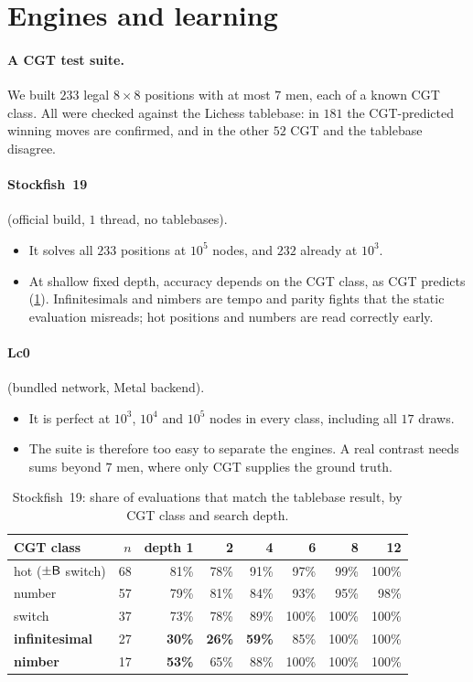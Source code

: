 \section{Engines and learning}\label{sec:engines}

\paragraph{A CGT test suite.} We built $233$ legal $8\times8$ positions with at most $7$ men, each of a known
CGT class. All were checked against the Lichess tablebase: in $181$ the CGT-predicted winning moves are
confirmed, and in the other $52$ CGT and the tablebase disagree.

\paragraph{Stockfish~19} (official build, $1$ thread, no tablebases).
\begin{itemize}
\item It solves all $233$ positions at $10^5$ nodes, and $232$ already at $10^3$.
\item At shallow fixed depth, accuracy depends on the CGT class, as CGT predicts (\cref{tab:sf}). Infinitesimals
  and nimbers are tempo and parity fights that the static evaluation misreads; hot positions and numbers are
  read correctly early.
\end{itemize}

\paragraph{Lc0} (bundled network, Metal backend).
\begin{itemize}
\item It is perfect at $10^3$, $10^4$ and $10^5$ nodes in every class, including all $17$ draws.
\item The suite is therefore too easy to separate the engines. A real contrast needs sums beyond $7$ men, where
  only CGT supplies the ground truth.
\end{itemize}

\begin{table}[ht]
\centering\small
\begin{tabular}{@{}lrrrrrrr@{}}
\toprule
CGT class & $n$ & depth 1 & 2 & 4 & 6 & 8 & 12 \\
\midrule
hot ($\pm\mathsf{B}$ switch) & 68 & 81\% & 78\% & 91\% & 97\% & 99\% & 100\% \\
number & 57 & 79\% & 81\% & 84\% & 93\% & 95\% & 98\% \\
switch & 37 & 73\% & 78\% & 89\% & 100\% & 100\% & 100\% \\
\textbf{infinitesimal} & 27 & \textbf{30\%} & \textbf{26\%} & \textbf{59\%} & 85\% & 100\% & 100\% \\
\textbf{nimber} & 17 & \textbf{53\%} & 65\% & 88\% & 100\% & 100\% & 100\% \\
\bottomrule
\end{tabular}
\caption{Stockfish~19: share of evaluations that match the tablebase result, by CGT class and search depth.}
\label{tab:sf}
\end{table}

